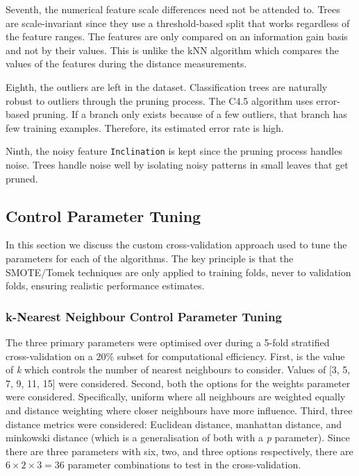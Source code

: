 \documentclass[10pt, conference]{IEEEtran}
\begin{document}
Seventh, the numerical feature scale differences need not be attended to. Trees are scale-invariant since they use a threshold-based split that works regardless of the feature ranges. The features are only compared on an information gain basis and not by their values. This is unlike the kNN algorithm which compares the values of the features during the distance measurements.

Eighth, the outliers are left in the dataset. Classification trees are naturally robust to outliers through the pruning process. The C4.5 algorithm \cite{quinlan1993c45} uses error-based pruning. If a branch only exists because of a few outliers, that branch has few training examples. Therefore, its estimated error rate is high.

Ninth, the noisy feature \texttt{Inclination} is kept since the pruning process handles noise. Trees handle noise well by isolating noisy patterns in small leaves that get pruned.


\subsection{Control Parameter Tuning}
In this section we discuss the custom cross-validation approach used to tune the parameters for each of the algorithms. The key principle is that the SMOTE/Tomek techniques are only applied to training folds, never to validation folds, ensuring realistic performance estimates.
\subsubsection{k-Nearest Neighbour Control Parameter Tuning}
The three primary parameters were optimised over during a 5-fold stratified cross-validation on a 20\% subset for computational efficiency. First, is the value of \textit{k} which controls the number of nearest neighbours to consider. Values of [3, 5, 7, 9, 11, 15] were considered. Second, both the options for the weights parameter were considered. Specifically, uniform where all neighbours are weighted equally and distance weighting where closer neighbours have more influence. Third, three distance metrics were considered: Euclidean distance, manhattan distance, and minkowski distance (which is a generalisation of both with a \textit{p} parameter). Since there are three parameters with six, two, and three options respectively, there are $6 \times 2 \times 3 = 36$ parameter combinations to test in the cross-validation. 
	
\end{document}
